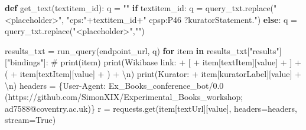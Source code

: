 \documentclass[
  letterpaper,
]{book}
\newenvironment{Shaded}{\begin{snugshade}}{\end{snugshade}}
\newcommand{\BuiltInTok}[1]{\textcolor[rgb]{0.00,0.23,0.31}{#1}}
\newcommand{\CharTok}[1]{\textcolor[rgb]{0.13,0.47,0.30}{#1}}
\newcommand{\CommentTok}[1]{\textcolor[rgb]{0.37,0.37,0.37}{#1}}
\newcommand{\ControlFlowTok}[1]{\textcolor[rgb]{0.00,0.23,0.31}{\textbf{#1}}}
\newcommand{\KeywordTok}[1]{\textcolor[rgb]{0.00,0.23,0.31}{\textbf{#1}}}
\newcommand{\NormalTok}[1]{\textcolor[rgb]{0.00,0.23,0.31}{#1}}
\newcommand{\OperatorTok}[1]{\textcolor[rgb]{0.37,0.37,0.37}{#1}}
\newcommand{\StringTok}[1]{\textcolor[rgb]{0.13,0.47,0.30}{#1}}
\newcommand{\VariableTok}[1]{\textcolor[rgb]{0.07,0.07,0.07}{#1}}
\begin{document}
\begin{Shaded}
\begin{Highlighting}[]
\KeywordTok{def}\NormalTok{ get\_text(textitem\_id):}
\NormalTok{    q }\OperatorTok{=} \StringTok{""}
    \ControlFlowTok{if}\NormalTok{ textitem\_id:}
\NormalTok{        q }\OperatorTok{=}\NormalTok{ query\_txt.replace(}\StringTok{"\textless{}placeholder\textgreater{}"}\NormalTok{, }\StringTok{"cps:"}\OperatorTok{+}\NormalTok{textitem\_id}\OperatorTok{+}\StringTok{" cpsp:P46 ?kuratorStatement."}\NormalTok{)}
    \ControlFlowTok{else}\NormalTok{:}
\NormalTok{        q }\OperatorTok{=}\NormalTok{ query\_txt.replace(}\StringTok{"\textless{}placeholder\textgreater{}"}\NormalTok{,}\StringTok{""}\NormalTok{)}

\NormalTok{    results\_txt }\OperatorTok{=}\NormalTok{ run\_query(endpoint\_url, q)}
    \ControlFlowTok{for}\NormalTok{ item }\KeywordTok{in}\NormalTok{ results\_txt[}\StringTok{"results"}\NormalTok{][}\StringTok{"bindings"}\NormalTok{]:}
        \CommentTok{\# print(item)}
        \BuiltInTok{print}\NormalTok{(}\StringTok{\textquotesingle{}Wikibase link: \textquotesingle{}} \OperatorTok{+} \StringTok{\textquotesingle{}[\textquotesingle{}} \OperatorTok{+}\NormalTok{ item[}\StringTok{\textquotesingle{}textItem\textquotesingle{}}\NormalTok{][}\StringTok{\textquotesingle{}value\textquotesingle{}}\NormalTok{] }\OperatorTok{+} \StringTok{\textquotesingle{}]\textquotesingle{}} \OperatorTok{+} \StringTok{\textquotesingle{}(\textquotesingle{}} \OperatorTok{+}\NormalTok{ item[}\StringTok{\textquotesingle{}textItem\textquotesingle{}}\NormalTok{][}\StringTok{\textquotesingle{}value\textquotesingle{}}\NormalTok{] }\OperatorTok{+} \StringTok{\textquotesingle{})\textquotesingle{}} \OperatorTok{+} \StringTok{\textquotesingle{}}\CharTok{\textbackslash{}n}\StringTok{\textquotesingle{}}\NormalTok{)}
        \BuiltInTok{print}\NormalTok{(}\StringTok{\textquotesingle{}Kurator: \textquotesingle{}} \OperatorTok{+}\NormalTok{ item[}\StringTok{\textquotesingle{}kuratorLabel\textquotesingle{}}\NormalTok{][}\StringTok{\textquotesingle{}value\textquotesingle{}}\NormalTok{] }\OperatorTok{+} \StringTok{\textquotesingle{}}\CharTok{\textbackslash{}n}\StringTok{\textquotesingle{}}\NormalTok{)}
\NormalTok{        headers }\OperatorTok{=}\NormalTok{ \{}\StringTok{\textquotesingle{}User{-}Agent\textquotesingle{}}\NormalTok{: }\StringTok{\textquotesingle{}Ex\_Books\_conference\_bot/0.0 (https://github.com/SimonXIX/Experimental\_Books\_workshop; ad7588@coventry.ac.uk)\textquotesingle{}}\NormalTok{\}}
\NormalTok{        r }\OperatorTok{=}\NormalTok{ requests.get(item[}\StringTok{\textquotesingle{}textUrl\textquotesingle{}}\NormalTok{][}\StringTok{\textquotesingle{}value\textquotesingle{}}\NormalTok{], headers}\OperatorTok{=}\NormalTok{headers, stream}\OperatorTok{=}\VariableTok{True}\NormalTok{)}

\end{Highlighting}
\end{Shaded}
\end{document}

